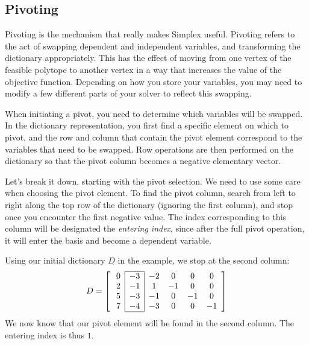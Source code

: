 \subsection{Pivoting} %

Pivoting is the mechanism that really makes Simplex useful.
Pivoting refers to the act of swapping dependent and independent variables, and transforming the dictionary appropriately.
This has the effect of moving from one vertex of the feasible polytope to another vertex in a way that increases the value of the objective function.
Depending on how you store your variables, you may need to modify a few different parts of your solver to reflect this swapping.

When initiating a pivot, you need to determine which variables will be swapped.
In the dictionary representation, you first find a specific element on which to pivot, and the row and column that contain the pivot element correspond to the variables that need to be swapped.
Row operations are then performed on the dictionary so that the pivot column becomes a negative elementary vector.

Let's break it down, starting with the pivot selection.
We need to use some care when choosing the pivot element.
To find the pivot column, search from left to right along the top row of the dictionary (ignoring the first column), and stop once you encounter the first negative value.
The index corresponding to this column will be designated the \emph{entering index}, since after the full pivot operation, it will enter
the basis and become a dependent variable.

Using our initial dictionary $D$ in the example, we stop at the second column:
\[ D = \left[ \:
\begin{array}{*{7}{c}}
\cline{2-2}
0 & \multicolumn{1}{|c}{-3} & \multicolumn{1}{|c}{-2} & 0 & 0 & 0\\
2 & \multicolumn{1}{|c}{-1} & \multicolumn{1}{|c}{1} & -1 & 0 & 0\\
5 & \multicolumn{1}{|c}{-3} & \multicolumn{1}{|c}{-1} & 0 & -1 & 0\\
7 & \multicolumn{1}{|c}{-4} & \multicolumn{1}{|c}{-3} & 0 & 0 & -1\\
\cline{2-2}
\end{array}
\right] \]
We now know that our pivot element will be found in the second column.
The entering index is thus $1$.

